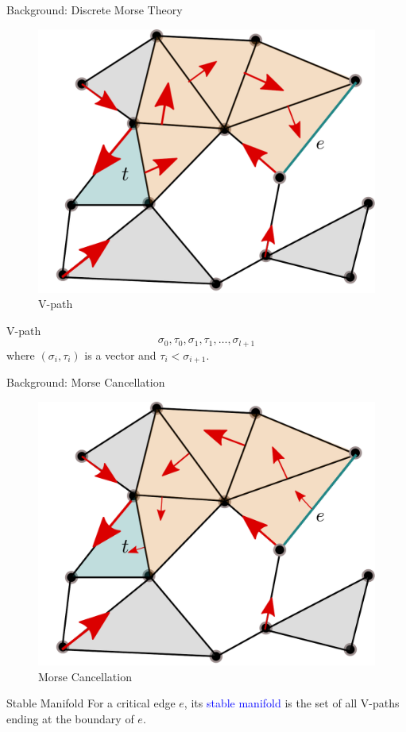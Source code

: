 \documentclass[9pt,sans-serif]{beamer}
\begin{document}
\begin{frame}{Background: Discrete Morse Theory}
 \begin{figure}[htb]
    \centering \includegraphics[scale=0.3]{vpath}
    \caption{V-path}
  \end{figure}

 \begin{block}{V-path}
   $$\sigma_0,\tau_0,\sigma_1,\tau_1,\ldots,\sigma_{l+1}$$
   where $(\sigma_i,\tau_i)$ is a vector and $\tau_i<\sigma_{i+1}$.
 \end{block}
\end{frame}

\begin{frame}{Background: Morse Cancellation}
  \begin{figure}[htb]
    \centering \includegraphics[scale=0.3]{cancellation}
    \caption{Morse Cancellation}
  \end{figure}

  \pause
  
  \begin{block}{Stable Manifold}
    For a critical edge $e$, its \textcolor{blue}{stable manifold} is the set of
    all V-paths ending at the boundary of $e$.
  \end{block}
\end{frame}
\end{document}
